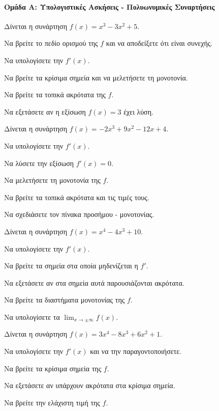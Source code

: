 \documentclass[11pt,a4paper,modern]{FFExercises}
\begin{document}

\paragraph{Ομάδα Α: Υπολογιστικές Ασκήσεις - Πολυωνυμικές Συναρτήσεις}

\askhsh
Δίνεται η συνάρτηση $f(x) = x^3 - 3x^2 + 5$.
\begin{alist}
    \item Να βρείτε το πεδίο ορισμού της $f$ και να αποδείξετε ότι είναι συνεχής.
    \item Να υπολογίσετε την $f'(x)$.
    \item Να βρείτε τα κρίσιμα σημεία και να μελετήσετε τη μονοτονία.
    \item Να βρείτε τα τοπικά ακρότατα της $f$.
    \item Να εξετάσετε αν η εξίσωση $f(x) = 3$ έχει λύση.
\end{alist}

\askhsh
Δίνεται η συνάρτηση $f(x) = -2x^3 + 9x^2 - 12x + 4$.
\begin{alist}
    \item Να υπολογίσετε την $f'(x)$.
    \item Να λύσετε την εξίσωση $f'(x) = 0$.
    \item Να μελετήσετε τη μονοτονία της $f$.
    \item Να βρείτε τα τοπικά ακρότατα και τις τιμές τους.
    \item Να σχεδιάσετε τον πίνακα προσήμου - μονοτονίας.
\end{alist}

\askhsh
Δίνεται η συνάρτηση $f(x) = x^4 - 4x^3 + 10$.
\begin{alist}
    \item Να υπολογίσετε την $f'(x)$.
    \item Να βρείτε τα σημεία στα οποία μηδενίζεται η $f'$.
    \item Να εξετάσετε αν στα σημεία αυτά παρουσιάζονται ακρότατα.
    \item Να βρείτε τα διαστήματα μονοτονίας της $f$.
    \item Να υπολογίσετε τα $\lim_{x \to \pm\infty} f(x)$.
\end{alist}

\askhsh
Δίνεται η συνάρτηση $f(x) = 3x^4 - 8x^3 + 6x^2 + 1$.
\begin{alist}
    \item Να υπολογίσετε την $f'(x)$ και να την παραγοντοποιήσετε.
    \item Να βρείτε τα κρίσιμα σημεία της $f$.
    \item Να εξετάσετε αν υπάρχουν ακρότατα στα κρίσιμα σημεία.
    \item Να βρείτε την ελάχιστη τιμή της $f$.
\end{alist}
\end{document}
